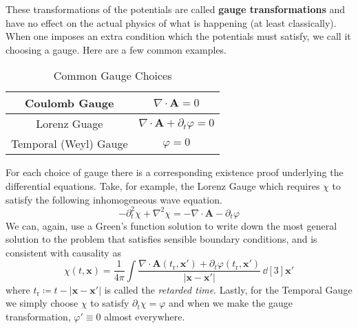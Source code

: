 These transformations of the potentials are called \textbf{gauge transformations} and have no effect on the actual physics of what is happening (at least classically). When one imposes an extra condition which the potentials must satisfy, we call it choosing a gauge. Here are a few common examples.
\begin{table}[H]
\centering
\begin{tabular}{| c | c |} \hline
Coulomb Gauge & $\nabla\cdot\mathbf{A} = 0$ \\ \hline
Lorenz Guage & $\nabla\cdot\mathbf{A} + \partial_t\varphi = 0$ \\ \hline
Temporal (Weyl) Gauge & $\varphi = 0$ \\ \hline
\end{tabular}
\caption{Common Gauge Choices}
\label{table:gauges}
\end{table}
For each choice of gauge there is a corresponding existence proof underlying the differential equations. Take, for example, the Lorenz Gauge which requires $\chi$ to satisfy the following inhomogeneous wave equation.
\begin{equation*}
-\partial_t^2\chi + \nabla^2\chi = -\nabla\cdot\mathbf{A} - \partial_t\varphi
\end{equation*}
We can, again, use a Green's function solution to write down the most general solution to the problem that satisfies sensible boundary conditions, and is consistent with causality as
\begin{equation*}
\chi(t,\mathbf{x}) = \frac{1}{4\pi}\int \frac{\nabla\cdot\mathbf{A}(t_\text{r},\mathbf{x}') + \partial_t\varphi(t_\text{r},\mathbf{x}')}{\left|\mathbf{x} - \mathbf{x}'\right|}\,\dd[3]{\mathbf{x}'}
\end{equation*}
where $t_\text{r}\coloneqq t - \left|\mathbf{x} - \mathbf{x}'\right|$ is called the \textit{retarded time}.
Lastly, for the Temporal Gauge we simply choose $\chi$ to satisfy $\partial_t\chi = \varphi$ and when we make the gauge transformation, $\varphi'\equiv 0$ almost everywhere.

